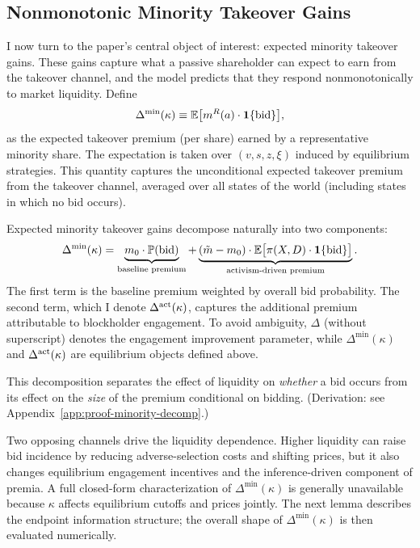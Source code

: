 \documentclass[11pt]{article}
\newcommand{\E}{\mathbb{E}}
\newcommand{\PP}{\mathbb{P}}
\newcommand{\1}{\mathbf{1}}
\begin{document}
%
\subsection{Nonmonotonic Minority Takeover Gains}
%

I now turn to the paper's central object of interest: expected minority takeover gains. These gains capture what a passive shareholder can expect to earn from the takeover channel, and the model predicts that they respond nonmonotonically to market liquidity. Define
\begin{equation}
\Delta^{\min}(\kappa) \equiv \E\big[m^{R}(a) \cdot \1\{\textup{bid}\}\big],
\label{eq:minority}
\end{equation}
as the expected takeover premium (per share) earned by a representative minority share. The expectation is taken over $(v,s,z,\xi)$ induced by equilibrium strategies. This quantity captures the unconditional expected takeover premium from the takeover channel, averaged over all states of the world (including states in which no bid occurs).

Expected minority takeover gains decompose naturally into two components:
\begin{equation}
\Delta^{\min}(\kappa) = \underbrace{m_0 \cdot \PP(\textup{bid})}_{\text{baseline premium}} + \underbrace{(\tilde{m}-m_0)\cdot \E\big[\pi(X,D)\cdot \1\{\textup{bid}\}\big]}_{\text{activism-driven premium}}.
\label{eq:decomp}
\end{equation}
The first term is the baseline premium weighted by overall bid probability. The second term, which I denote $\Delta^{\textup{act}}(\kappa)$, captures the additional premium attributable to blockholder engagement. To avoid ambiguity, $\Delta$ (without superscript) denotes the engagement improvement parameter, while $\Delta^{\min}(\kappa)$ and $\Delta^{\textup{act}}(\kappa)$ are equilibrium objects defined above.

This decomposition separates the effect of liquidity on \emph{whether} a bid occurs from its effect on the \emph{size} of the premium conditional on bidding. (Derivation: see Appendix~\ref{app:proof-minority-decomp}.)

Two opposing channels drive the liquidity dependence. Higher liquidity can raise bid incidence by reducing adverse-selection costs and shifting prices, but it also changes equilibrium engagement incentives and the inference-driven component of premia. A full closed-form characterization of $\Delta^{\min}(\kappa)$ is generally unavailable because $\kappa$ affects equilibrium cutoffs and prices jointly. The next lemma describes the endpoint information structure; the overall shape of $\Delta^{\min}(\kappa)$ is then evaluated numerically.
\end{document}
